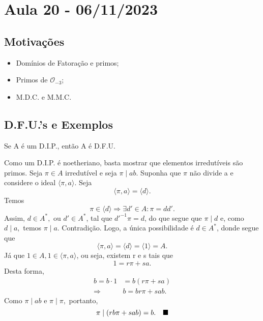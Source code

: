 \documentclass[algebraII_notes.tex]{subfiles}
\begin{document}
\section{Aula 20 - 06/11/2023}
\subsection{Motivações}
\begin{itemize}
	\item Domínios de Fatoração e primos;
	\item Primos de \(\mathcal{O}_{-3}\);
	\item M.D.C. e M.M.C.
\end{itemize}
\subsection{D.F.U.'s e Exemplos}
\begin{theorem*}
	Se A é um D.I.P., então A é D.F.U.
\end{theorem*}
\begin{proof*}
	Como um D.I.P. é noetheriano, basta mostrar que elementos irredutíveis são primos.
	Seja \(\pi \in A\) irredutível e seja \(\pi \mid ab.\) Suponha que \(\pi\) não divide a e considere
	o ideal \(\langle \pi , a \rangle.\) Seja
	\[
		\langle \pi , a \rangle = \langle d \rangle.
	\]
	Temos
	\[
		\pi \in \langle d \rangle \Rightarrow \exists d'\in A: \pi  = dd'.
	\]
	Assim, \(d\in A^{*},\) ou \(d'\in A^{*}\), tal que \(d'^{-1}\pi  = d\), do que segue que \(\pi \mid d\) e,
	como \(d\mid a,\) temos \(\pi \mid a.\) Contradição. Logo, a única possibilidade é \(d\in A^{*}\), donde segue que
	\[
		\langle \pi , a \rangle = \langle d \rangle = \langle 1 \rangle = A.
	\]
	Já que \(1\in A, 1\in \langle \pi , a \rangle\), ou seja, existem r e s tais que
	\[
		1 = r\pi +sa.
	\]
	Desta forma,
	\begin{align*}
		b = b \cdot 1 & = b(r\pi + sa)   \\
		\Rightarrow   & b = br\pi + sab.
	\end{align*}
	Como \(\pi \mid ab\) e \(\pi \mid \pi ,\) portanto,
	\[
		\pi \mid(rb\pi +sab) = b.\quad \text{$\blacksquare$}
	\]
\end{proof*}
\end{document}

